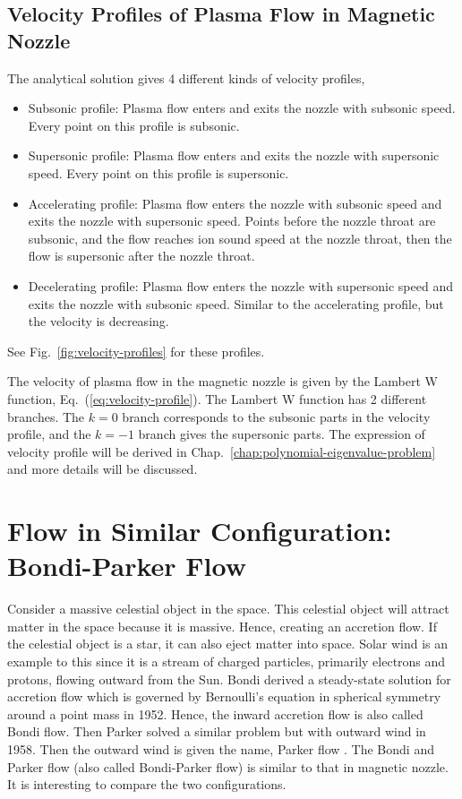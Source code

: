 \subsection{Velocity Profiles of Plasma Flow in Magnetic Nozzle}
The analytical solution gives 4 different kinds of velocity profiles,
\begin{itemize}
	\item Subsonic profile: Plasma flow enters and exits the nozzle with subsonic speed. Every point on this profile is subsonic.
	\item Supersonic profile: Plasma flow enters and exits the nozzle with supersonic speed. Every point on this profile is supersonic.
	\item Accelerating profile: Plasma flow enters the nozzle with subsonic speed and exits the nozzle with supersonic speed. Points before the nozzle throat are subsonic, and the flow reaches ion sound speed at the nozzle throat, then the flow is supersonic after the nozzle throat.
	\item Decelerating profile: Plasma flow enters the nozzle with supersonic speed and exits the nozzle with subsonic speed. Similar to the accelerating profile, but the velocity is decreasing.
\end{itemize}
See Fig.~\ref{fig:velocity-profiles} for these profiles.

The velocity of plasma flow in the magnetic nozzle is given by the Lambert W function, Eq.~(\ref{eq:velocity-profile}). The Lambert W function has 2 different branches. The $k=0$ branch corresponds to the subsonic parts in the velocity profile, and the $k=-1$ branch gives the supersonic parts. The expression of velocity profile will be derived in Chap.~\ref{chap:polynomial-eigenvalue-problem} and more details will be discussed.

\section{Flow in Similar Configuration: Bondi-Parker Flow}
Consider a massive celestial object in the space. This celestial object will attract matter in the space because it is massive. Hence, creating an accretion flow. If the celestial object is a star, it can also eject matter into space. Solar wind is an example to this since it is a stream of charged particles, primarily electrons and protons, flowing outward from the Sun. Bondi derived a steady-state solution for accretion flow which is governed by Bernoulli's equation in spherical symmetry around a point mass in 1952. Hence, the inward accretion flow is also called Bondi flow. Then Parker solved a similar problem but with outward wind in 1958. Then the outward wind is given the name, Parker flow \cite{aikawa_stability_1979,bondi_spherically_1952,keto_stability_2020}. The Bondi and Parker flow (also called Bondi-Parker flow) is similar to that in magnetic nozzle. It is interesting to compare the two configurations.

